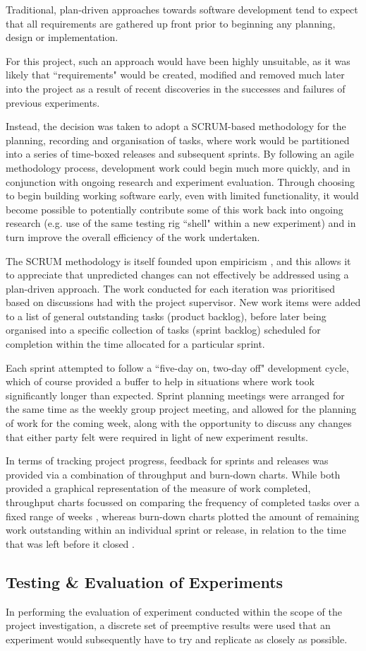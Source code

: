 Traditional, plan-driven approaches towards software development tend to expect that all requirements are gathered up front prior to beginning any planning, design or implementation. 

For this project, such an approach would have been highly unsuitable, as it was likely that ``requirements" would be created, modified and removed much later into the project as a result of recent discoveries in the successes and failures of previous experiments. 

Instead, the decision was taken to adopt a SCRUM-based methodology for the planning, recording and organisation of tasks, where work would be partitioned into a series of time-boxed releases and subsequent sprints. By following an agile methodology process, development work could begin much more quickly, and in conjunction with ongoing research and experiment evaluation. Through choosing to begin building working software early, even with limited functionality, it would become possible to potentially contribute some of this work back into ongoing research (e.g. use of the same testing rig ``shell" within a new experiment) and in turn improve the overall efficiency of the work undertaken.

The SCRUM methodology is itself founded upon empiricism \cite{}, and this allows it to appreciate that unpredicted changes can not effectively be addressed using a plan-driven approach. The work conducted for each iteration was prioritised based on discussions had with the project supervisor. New work items were added to a list of general outstanding tasks (product backlog), before later being organised into a specific collection of tasks (sprint backlog) scheduled for completion within the time allocated for a particular sprint.

Each sprint attempted to follow a ``five-day on, two-day off" development cycle, which of course provided a buffer to help in situations where work took significantly longer than expected. Sprint planning meetings were arranged for the same time as the weekly group project meeting, and allowed for the planning of work for the coming week, along with the opportunity to discuss any changes that either party felt were required in light of new experiment results.

In terms of tracking project progress, feedback for sprints and releases was provided via a combination of throughput and burn-down charts. While both provided a graphical representation of the measure of work completed, throughput charts focussed on comparing the frequency of completed tasks over a fixed range of weeks \cite{}, whereas burn-down charts plotted the amount of remaining work outstanding within an individual sprint or release, in relation to the time that was left before it closed \cite{}.

\subsection{Testing \& Evaluation of Experiments}

In performing the evaluation of experiment conducted within the scope of the project investigation, a discrete set of preemptive results were used that an experiment would subsequently have to try and replicate as closely as possible.
